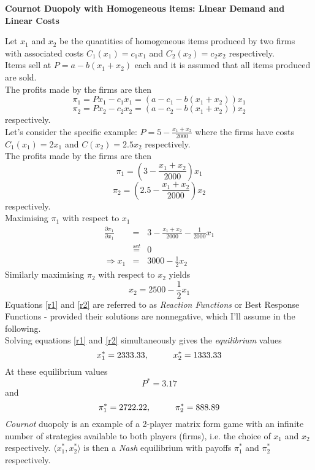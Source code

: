 \documentclass[12pt]{article}
\begin{document}
\begin{center}
\textbf{Cournot Duopoly with Homogeneous items: Linear Demand and Linear Costs %
}
\end{center}
Let $x_1$ and $x_2$ be the quantities of homogeneous items produced by two firms with associated costs $C_1(x_1) = c_1x_1$ and $C_2(x_2)= c_2x_2$ respectively.\\
Items sell at $P = a - b(x_1+x_2)$ each and it is assumed that all items produced are sold. \\ The profits made by the firms are then
$$ \pi_1 = P x_1 - c_1 x_1 = \left(a-c_1 - b(x_1+x_2)\right)x_1$$
$$ \pi_2 = P x_2 - c_2 x_2 = \left(a-c_2 - b(x_1+x_2)\right)x_2$$
respectively.\\
Let's consider the specific example: $ P = 5 -\frac{x_1 + x_2}{2000}$ where the firms have costs $ C_1(x_1) = 2x_1$ and $C(x_2) = 2.5x_2$ respectively.\\
The profits made by the firms are then
$$ \pi_1 = \left(3 - \frac{x_1+x_2}{2000}\right)x_1$$
$$ \pi_2 = \left(2.5 - \frac{x_1+x_2}{2000}\right)x_2$$
respectively.\\
Maximising $\pi_1$ with respect to $x_1$
\begin{eqnarray}
 \frac{\partial \pi_1} {\partial x_1} &=& 3 - \frac{x_1+x_2}{2000} - \frac{1}{2000}x_1 \nonumber \\
 & \stackrel{set}{=} & 0 \nonumber \\
 \Rightarrow x_1 &=& 3000 - \frac{1}{2} x_2 \label{r1}
 \end{eqnarray}
 Similarly maximising $\pi_2$ with respect to $x_2$ yields
 \begin{equation} x_2 = 2500 - \frac{1}{2} x_1 \label{r2} \end{equation}
 Equations \ref{r1} and \ref{r2} are referred to as \textit{Reaction Functions} or Best Response Functions -  provided their solutions are nonnegative, which I'll assume in the following.\\
 Solving equations \ref{r1} and \ref{r2} simultaneously gives the \textit{equilibrium} values
 $$ x_1^* = 2333.33, \hspace{10mm} x_2^* = 1333.33 $$
 At these equilibrium values
 $$ P^* = 3.17 $$
 and
 \begin{equation} \pi_1^* = 2722.22, \hspace{10mm} \pi_2^* = 888.89\label{cp} \end{equation}
 \textit{Cournot} duopoly is an example of a 2-player matrix form game with an infinite number of strategies available to both players (firms), i.e. the choice of $x_1$ and $x_2$ respectively. $\langle x_1^*, x_2^* \rangle $ is then a \textit{Nash} equilibrium with payoffs $ \pi_1^*$ and $\pi_2^*$ respectively.\\
\end{document}
